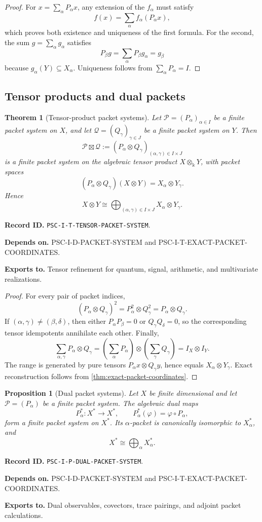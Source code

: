\documentclass[11pt]{article}
\newtheorem{theorem}{Theorem}[section]
\newtheorem{proposition}[proposition]{Proposition}
\theoremstyle{definition}
\theoremstyle{remark}
\newcommand{\bbk}{\Bbbk}
\newcommand{\Pcal}{\mathcal P}
\newcommand{\Qcal}{\mathcal Q}
\newcommand{\RecordID}[1]{\par\smallskip\noindent\begingroup\footnotesize\color{PSCGray}\raggedright\textbf{Record ID.} \nolinkurl{#1}.\par\endgroup}
\newcommand{\Depends}[1]{\par\noindent\begingroup\footnotesize\color{PSCGray}\raggedright\textbf{Depends on.} #1\par\endgroup}
\newcommand{\Exports}[1]{\par\noindent\begingroup\footnotesize\color{PSCGray}\raggedright\textbf{Exports to.} #1\par\endgroup}
\begin{document}
\begin{proof}
For \(x=\sum_\alpha P_\alpha x\), any extension of the \(f_\alpha\) must satisfy
\[
f(x)=\sum_\alpha f_\alpha(P_\alpha x),
\]
which proves both existence and uniqueness of the first formula.  For the second, the sum \(g=\sum_\alpha g_\alpha\) satisfies
\[
P_\beta g
=\sum_\alpha P_\beta g_\alpha
=g_\beta
\]
because \(g_\alpha(Y)\subseteq X_\alpha\).  Uniqueness follows from \(\sum_\alpha P_\alpha=I\).
\end{proof}


\subsection{Tensor products and dual packets}

\begin{theorem}[Tensor-product packet systems]
\label{thm:tensor-packet-system}
Let \(\Pcal=(P_\alpha)_{\alpha\in I}\) be a finite packet system on \(X\), and let \(\Qcal=(Q_\gamma)_{\gamma\in J}\) be a finite packet system on \(Y\).  Then
\[
\Pcal\boxtimes\Qcal
:=
(P_\alpha\otimes Q_\gamma)_{(\alpha,\gamma)\in I\times J}
\]
is a finite packet system on the algebraic tensor product \(X\otimes_{\bbk}Y\), with packet spaces
\[
(P_\alpha\otimes Q_\gamma)(X\otimes Y)
=X_\alpha\otimes Y_\gamma.
\]
Hence
\[
\boxed{
X\otimes Y
\cong
\bigoplus_{(\alpha,\gamma)\in I\times J}
X_\alpha\otimes Y_\gamma.
}
\]
\end{theorem}
\RecordID{PSC-I-T-TENSOR-PACKET-SYSTEM}
\Depends{PSC-I-D-PACKET-SYSTEM and PSC-I-T-EXACT-PACKET-COORDINATES.}
\Exports{Tensor refinement for quantum, signal, arithmetic, and multivariate realizations.}

\begin{proof}
For every pair of packet indices,
\[
(P_\alpha\otimes Q_\gamma)^2
=P_\alpha^2\otimes Q_\gamma^2
=P_\alpha\otimes Q_\gamma.
\]
If \((\alpha,\gamma)\neq(\beta,\delta)\), then either \(P_\alpha P_\beta=0\) or \(Q_\gamma Q_\delta=0\), so the corresponding tensor idempotents annihilate each other.  Finally,
\[
\sum_{\alpha,\gamma}P_\alpha\otimes Q_\gamma
=
\left(\sum_\alpha P_\alpha\right)
\otimes
\left(\sum_\gamma Q_\gamma\right)
=I_X\otimes I_Y.
\]
The range is generated by pure tensors \(P_\alpha x\otimes Q_\gamma y\), hence equals \(X_\alpha\otimes Y_\gamma\).  Exact reconstruction follows from \cref{thm:exact-packet-coordinates}.
\end{proof}

\begin{proposition}[Dual packet systems]
\label{prop:dual-packet-system}
Let \(X\) be finite dimensional and let \(\Pcal=(P_\alpha)\) be a finite packet system.  The algebraic dual maps
\[
P_\alpha^*:X^*\to X^*,
\qquad
P_\alpha^*(\varphi)=\varphi\circ P_\alpha,
\]
form a finite packet system on \(X^*\).  Its \(\alpha\)-packet is canonically isomorphic to \(X_\alpha^*\), and
\[
X^*\cong\bigoplus_\alpha X_\alpha^*.
\]
\end{proposition}
\RecordID{PSC-I-P-DUAL-PACKET-SYSTEM}
\Depends{PSC-I-D-PACKET-SYSTEM and PSC-I-T-EXACT-PACKET-COORDINATES.}
\Exports{Dual observables, covectors, trace pairings, and adjoint packet calculations.}
\end{document}
